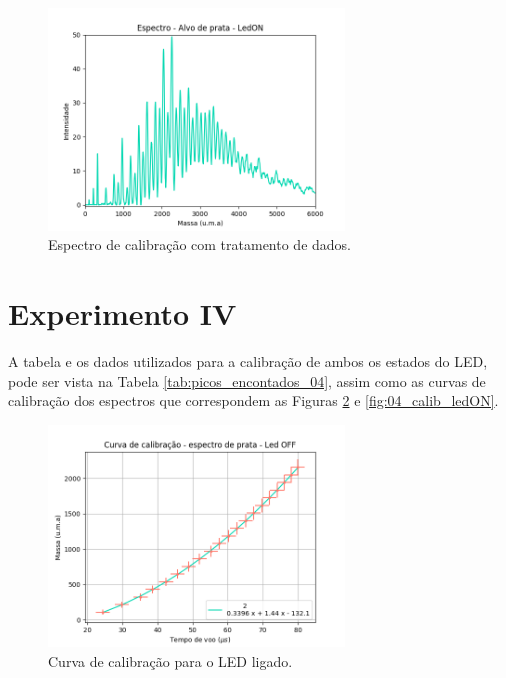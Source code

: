\begin{figure}
  \centering  
  \includegraphics[width=0.7\textwidth]{exp_03/LEDON_espec_calib_ag_massa.png}
  \caption{Espectro de calibração com tratamento de dados.}
  \label{fig:03_ledon_massa} 
\end{figure}

\section{Experimento IV}
A tabela e os dados utilizados para a calibração de ambos os estados do LED, pode ser vista na Tabela \ref{tab:picos_encontados_04}, assim como as curvas de calibração dos espectros que correspondem as Figuras \ref{fig:04_calib_ledOFF} e \ref{fig:04_calib_ledON}.

\begin{figure}
  \centering  
  \includegraphics[width=0.7\textwidth]{exp_04/LEDOFF_curv+erro_calib.png}
  \caption{Curva de calibração para o LED ligado.}
  \label{fig:04_calib_ledOFF} 
\end{figure}

